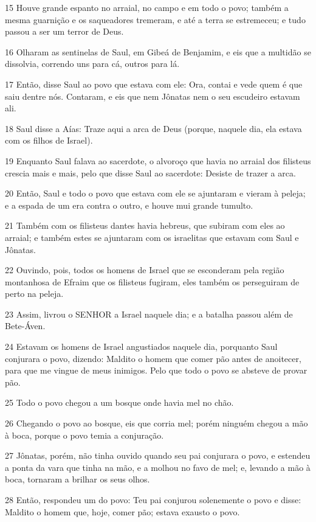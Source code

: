 \par 15 Houve grande espanto no arraial, no campo e em todo o povo; também a mesma guarnição e os saqueadores tremeram, e até a terra se estremeceu; e tudo passou a ser um terror de Deus.
\par 16 Olharam as sentinelas de Saul, em Gibeá de Benjamim, e eis que a multidão se dissolvia, correndo uns para cá, outros para lá.
\par 17 Então, disse Saul ao povo que estava com ele: Ora, contai e vede quem é que saiu dentre nós. Contaram, e eis que nem Jônatas nem o seu escudeiro estavam ali.
\par 18 Saul disse a Aías: Traze aqui a arca de Deus (porque, naquele dia, ela estava com os filhos de Israel).
\par 19 Enquanto Saul falava ao sacerdote, o alvoroço que havia no arraial dos filisteus crescia mais e mais, pelo que disse Saul ao sacerdote: Desiste de trazer a arca.
\par 20 Então, Saul e todo o povo que estava com ele se ajuntaram e vieram à peleja; e a espada de um era contra o outro, e houve mui grande tumulto.
\par 21 Também com os filisteus dantes havia hebreus, que subiram com eles ao arraial; e também estes se ajuntaram com os israelitas que estavam com Saul e Jônatas.
\par 22 Ouvindo, pois, todos os homens de Israel que se esconderam pela região montanhosa de Efraim que os filisteus fugiram, eles também os perseguiram de perto na peleja.
\par 23 Assim, livrou o SENHOR a Israel naquele dia; e a batalha passou além de Bete-Áven.
\par 24 Estavam os homens de Israel angustiados naquele dia, porquanto Saul conjurara o povo, dizendo: Maldito o homem que comer pão antes de anoitecer, para que me vingue de meus inimigos. Pelo que todo o povo se absteve de provar pão.
\par 25 Todo o povo chegou a um bosque onde havia mel no chão.
\par 26 Chegando o povo ao bosque, eis que corria mel; porém ninguém chegou a mão à boca, porque o povo temia a conjuração.
\par 27 Jônatas, porém, não tinha ouvido quando seu pai conjurara o povo, e estendeu a ponta da vara que tinha na mão, e a molhou no favo de mel; e, levando a mão à boca, tornaram a brilhar os seus olhos.
\par 28 Então, respondeu um do povo: Teu pai conjurou solenemente o povo e disse: Maldito o homem que, hoje, comer pão; estava exausto o povo.
